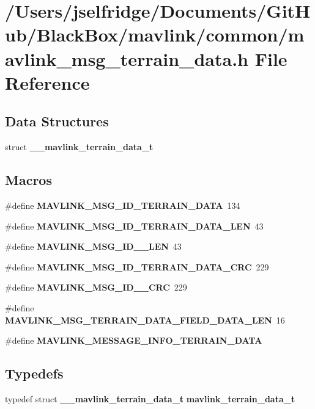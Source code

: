 \section{/\+Users/jselfridge/\+Documents/\+Git\+Hub/\+Black\+Box/mavlink/common/mavlink\+\_\+msg\+\_\+terrain\+\_\+data.h File Reference}
\label{mavlink__msg__terrain__data_8h}
\subsection*{Data Structures}
\begin{DoxyCompactItemize}
\item 
struct \textbf{ \+\_\+\+\_\+mavlink\+\_\+terrain\+\_\+data\+\_\+t}
\end{DoxyCompactItemize}
\subsection*{Macros}
\begin{DoxyCompactItemize}
\item 
\#define \textbf{ M\+A\+V\+L\+I\+N\+K\+\_\+\+M\+S\+G\+\_\+\+I\+D\+\_\+\+T\+E\+R\+R\+A\+I\+N\+\_\+\+D\+A\+TA}~134
\item 
\#define \textbf{ M\+A\+V\+L\+I\+N\+K\+\_\+\+M\+S\+G\+\_\+\+I\+D\+\_\+\+T\+E\+R\+R\+A\+I\+N\+\_\+\+D\+A\+T\+A\+\_\+\+L\+EN}~43
\item 
\#define \textbf{ M\+A\+V\+L\+I\+N\+K\+\_\+\+M\+S\+G\+\_\+\+I\+D\+\_\+\_\+\+L\+EN}~43
\item 
\#define \textbf{ M\+A\+V\+L\+I\+N\+K\+\_\+\+M\+S\+G\+\_\+\+I\+D\+\_\+\+T\+E\+R\+R\+A\+I\+N\+\_\+\+D\+A\+T\+A\+\_\+\+C\+RC}~229
\item 
\#define \textbf{ M\+A\+V\+L\+I\+N\+K\+\_\+\+M\+S\+G\+\_\+\+I\+D\+\_\+\_\+\+C\+RC}~229
\item 
\#define \textbf{ M\+A\+V\+L\+I\+N\+K\+\_\+\+M\+S\+G\+\_\+\+T\+E\+R\+R\+A\+I\+N\+\_\+\+D\+A\+T\+A\+\_\+\+F\+I\+E\+L\+D\+\_\+\+D\+A\+T\+A\+\_\+\+L\+EN}~16
\item 
\#define \textbf{ M\+A\+V\+L\+I\+N\+K\+\_\+\+M\+E\+S\+S\+A\+G\+E\+\_\+\+I\+N\+F\+O\+\_\+\+T\+E\+R\+R\+A\+I\+N\+\_\+\+D\+A\+TA}
\end{DoxyCompactItemize}
\subsection*{Typedefs}
\begin{DoxyCompactItemize}
\item 
typedef struct \textbf{ \+\_\+\+\_\+mavlink\+\_\+terrain\+\_\+data\+\_\+t} \textbf{ mavlink\+\_\+terrain\+\_\+data\+\_\+t}
\end{DoxyCompactItemize}


